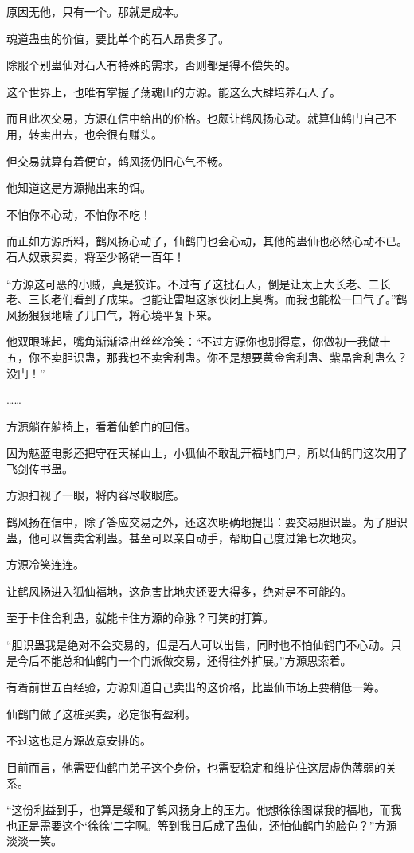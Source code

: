 \begin{this_body}
原因无他，只有一个。那就是成本。

魂道蛊虫的价值，要比单个的石人昂贵多了。

除服个别蛊仙对石人有特殊的需求，否则都是得不偿失的。

这个世界上，也唯有掌握了荡魂山的方源。能这么大肆培养石人了。

而且此次交易，方源在信中给出的价格。也颇让鹤风扬心动。就算仙鹤门自己不用，转卖出去，也会很有赚头。

但交易就算有着便宜，鹤风扬仍旧心气不畅。

他知道这是方源抛出来的饵。

不怕你不心动，不怕你不吃！

而正如方源所料，鹤风扬心动了，仙鹤门也会心动，其他的蛊仙也必然心动不已。石人奴隶买卖，将至少畅销一百年！

“方源这可恶的小贼，真是狡诈。不过有了这批石人，倒是让太上大长老、二长老、三长老们看到了成果。也能让雷坦这家伙闭上臭嘴。而我也能松一口气了。”鹤风扬狠狠地喘了几口气，将心境平复下来。

他双眼眯起，嘴角渐渐溢出丝丝冷笑：“不过方源你也别得意，你做初一我做十五，你不卖胆识蛊，那我也不卖舍利蛊。你不是想要黄金舍利蛊、紫晶舍利蛊么？没门！”

……

方源躺在躺椅上，看着仙鹤门的回信。

因为魅蓝电影还把守在天梯山上，小狐仙不敢乱开福地门户，所以仙鹤门这次用了飞剑传书蛊。

方源扫视了一眼，将内容尽收眼底。

鹤风扬在信中，除了答应交易之外，还这次明确地提出：要交易胆识蛊。为了胆识蛊，他可以售卖舍利蛊。甚至可以亲自动手，帮助自己度过第七次地灾。

方源冷笑连连。

让鹤风扬进入狐仙福地，这危害比地灾还要大得多，绝对是不可能的。

至于卡住舍利蛊，就能卡住方源的命脉？可笑的打算。

“胆识蛊我是绝对不会交易的，但是石人可以出售，同时也不怕仙鹤门不心动。只是今后不能总和仙鹤门一个门派做交易，还得往外扩展。”方源思索着。

有着前世五百经验，方源知道自己卖出的这价格，比蛊仙市场上要稍低一筹。

仙鹤门做了这桩买卖，必定很有盈利。

不过这也是方源故意安排的。

目前而言，他需要仙鹤门弟子这个身份，也需要稳定和维护住这层虚伪薄弱的关系。

“这份利益到手，也算是缓和了鹤风扬身上的压力。他想徐徐图谋我的福地，而我也正是需要这个‘徐徐’二字啊。等到我日后成了蛊仙，还怕仙鹤门的脸色？”方源淡淡一笑。


\end{this_body}
